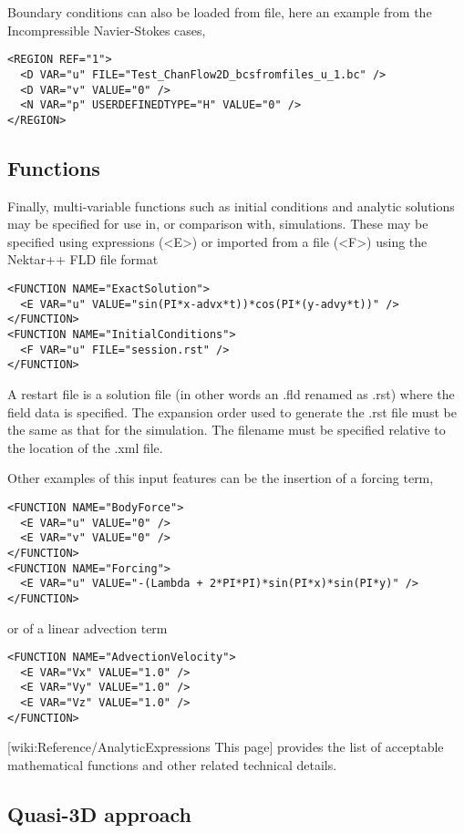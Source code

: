 Boundary conditions can also be loaded from file, here an example from the Incompressible Navier-Stokes cases,
\begin{lstlisting}[style=XMLStyle]
<REGION REF="1">
  <D VAR="u" FILE="Test_ChanFlow2D_bcsfromfiles_u_1.bc" />
  <D VAR="v" VALUE="0" />
  <N VAR="p" USERDEFINEDTYPE="H" VALUE="0" />
</REGION>
\end{lstlisting}

\subsection{Functions}

Finally, multi-variable functions such as initial conditions and analytic solutions may be specified for use in, or comparison with, simulations. These may be specified using expressions (<E>) or imported from a file (<F>) using the Nektar++ FLD file format
\begin{lstlisting}[style=XMLStyle]
<FUNCTION NAME="ExactSolution">
  <E VAR="u" VALUE="sin(PI*x-advx*t))*cos(PI*(y-advy*t))" />
</FUNCTION>
<FUNCTION NAME="InitialConditions">
  <F VAR="u" FILE="session.rst" />
</FUNCTION>
\end{lstlisting}
A restart file is a solution file (in other words an .fld renamed as .rst) where the field data is specified. The expansion order used to generate the .rst file must be the same as that for the simulation. The filename must be specified relative to the location of the .xml file.

Other examples of this input features can be the insertion of a forcing term,
\begin{lstlisting}[style=XMLStyle]
<FUNCTION NAME="BodyForce">
  <E VAR="u" VALUE="0" />
  <E VAR="v" VALUE="0" />
</FUNCTION>
<FUNCTION NAME="Forcing">
  <E VAR="u" VALUE="-(Lambda + 2*PI*PI)*sin(PI*x)*sin(PI*y)" />
</FUNCTION>
\end{lstlisting}
or of a linear advection term
\begin{lstlisting}[style=XMLStyle]
<FUNCTION NAME="AdvectionVelocity">
  <E VAR="Vx" VALUE="1.0" />
  <E VAR="Vy" VALUE="1.0" />
  <E VAR="Vz" VALUE="1.0" />
</FUNCTION>
\end{lstlisting}

[wiki:Reference/AnalyticExpressions This page] provides the list of acceptable mathematical functions and other related technical details.

\subsection{Quasi-3D approach}

